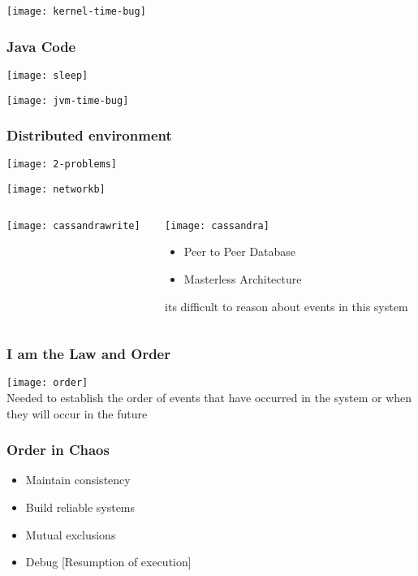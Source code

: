 \documentclass[aspectratio=169, 15pt,usenames,dvipsnames]{beamer}
\begin{document}
	\begin{gdblank}		
		\texttt{[image: kernel-time-bug]}
	\end{gdblank}  
	\begin{gdblank}		
		\frametitle{Java Code}
		\texttt{[image: sleep]}
	\end{gdblank}   
	\begin{gdblank}
		\texttt{[image: jvm-time-bug]}
	\end{gdblank}
	\begin{gdblank}
		\frametitle{Distributed environment}
		\centering
		\texttt{[image: 2-problems]}
	\end{gdblank}
	\begin{gdblank}
		\texttt{[image: networkb]}
	\end{gdblank}   
	\begin{gdblank}
		\begin{columns}
			\begin{column}{0.6\textwidth}
				\texttt{[image: cassandrawrite]}
			\end{column}
			\begin{column}{0.4\textwidth}
				\texttt{[image: cassandra]}
				\centering
				\begin{itemize}
					\item Peer to Peer Database
					\item Masterless Architecture
				\end{itemize}
				\tiny its difficult to reason about events in this system
			\end{column}
		\end{columns}
	\end{gdblank}   
	\begin{gdblank}
		\frametitle{I am the Law and Order}
		\centering
		\texttt{[image: order]}
		\\Needed to establish the order of events that have occurred in the system or when they will occur in the future
	\end{gdblank}
	\begin{gdblank}
		\frametitle{Order in Chaos}
		\LARGE
		\begin{itemize}
			\item Maintain consistency
			\item Build reliable systems
			\item Mutual exclusions
			\item Debug [Resumption of execution]
		\end{itemize}
	\end{gdblank}
\end{document}

